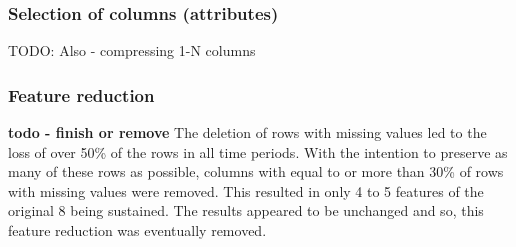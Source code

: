 \subsubsection{Selection of columns (attributes)}
TODO:
Also - compressing 1-N columns



\subsubsection{Feature reduction}
\textbf{todo - finish or remove}
The deletion of rows with missing values led to the loss of over 50\% of the rows in all time periods. With the intention to preserve as many of these rows as possible, columns with equal to or more than 30\% of rows with missing values were removed. This resulted in only 4 to 5 features of the original 8 being sustained. The results appeared to be unchanged and so, this feature reduction was eventually removed.



